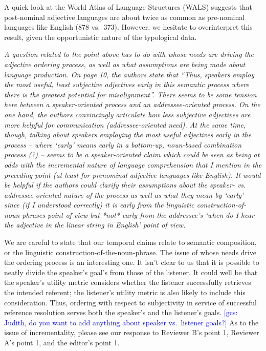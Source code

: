 \documentclass[12pt]{article}
\newcommand{\gcs}[1]{\textcolor{blue}{[gcs: #1]}}
\begin{document}
A quick look at the World Atlas of Language Structures (WALS) suggests that post-nominal adjective languages are about twice as common as pre-nominal languages like English (878 vs.~373). However, we hesitate to overinterpret this result, given the opportunistic nature of the typological data.

\item \emph{A question related to the point above has to do with whose needs are driving the adjective ordering process, as well as what assumptions are being made
about language production. On page 10, the authors state that ``Thus,
speakers employ the most useful, least subjective adjectives early in this
semantic process where there is the greatest potential for misalignment''.
There seems to be some tension here between a speaker-oriented process and
an addressee-oriented process. On the one hand, the authors convincingly
articulate how less subjective adjectives are more helpful for communication
(addressee-oriented need). At the same time, though, talking about speakers
employing the most useful adjectives early in the process – where
`early' means early in a bottom-up, noun-based combination process (?)
– seems to be a speaker-oriented claim which could be seen as being at
odds with the incremental nature of language comprehension that I mention in
the preceding point (at least for prenominal adjective languages like
English).   It would be helpful if the authors could clarify their
assumptions about the speaker- vs. addressee-oriented nature of the process
as well as what they mean by `early'  – since (if I understood
correctly) it is early from the linguistic construction-of-noun-phrases
point of view but *not* early from the addressee's `when do I hear the
adjective in the linear string in English' point of view.}

We are careful to state that our temporal claims relate to semantic composition, or the linguistic construction-of-the-noun-phrase. The issue of whose needs drive the ordering process is an interesting one. It isn't clear to us that it is possible to neatly divide the speaker's goal's from those of the listener. It could well be that the speaker's utility metric considers whether the listener successfully retrieves the intended referent; the listener's utility metric is also likely to include this consideration. Thus, ordering with respect to subjectivity in service of successful reference resolution serves both the speaker's and the listener's goals. \gcs{Judith, do you want to add anything about speaker vs.~listener goals?} As to the issue of incrementality, please see our response to Reviewer B's point 1, Reviewer A's point 1, and the editor's point 1. 
\end{document}
